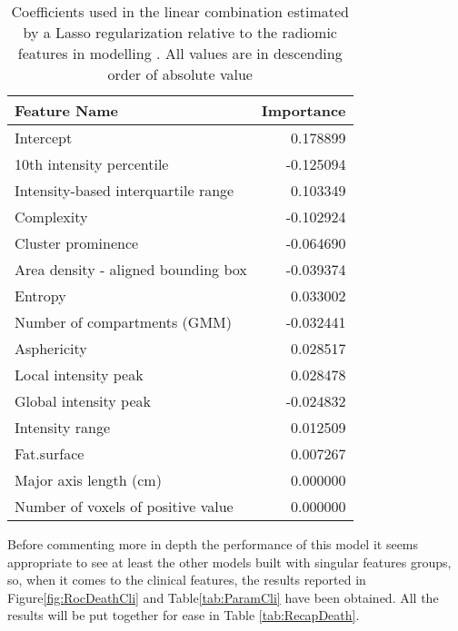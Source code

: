 \begin{table}
\caption{Coefficients used in the linear combination estimated by a Lasso regularization relative to the radiomic features in modelling \death. All values are in descending order of absolute value\label{tab:ParamRad}}
\centering 
	\begin{tabular}{lr}
		\toprule
		Feature Name &   Importance \\
		\midrule
		Intercept                           &                      0.178899 \\
		10th intensity percentile           &                     -0.125094 \\
		Intensity-based interquartile range &                      0.103349 \\
		Complexity                          &                     -0.102924 \\
		Cluster prominence                  &                     -0.064690 \\
		Area density - aligned bounding box &                     -0.039374 \\
		Entropy                             &                      0.033002 \\
		Number of compartments (GMM)        &                     -0.032441 \\
		Asphericity                         &                      0.028517 \\
		Local intensity peak                &                      0.028478 \\
		Global intensity peak               &                     -0.024832 \\
		Intensity range                     &                      0.012509 \\
		Fat.surface                         &                      0.007267 \\
		Major axis length (cm)              &                      0.000000 \\
		Number of voxels of positive value  &                      0.000000 \\
		\bottomrule
	\end{tabular}
\end{table}

Before commenting more in depth the performance of this model it seems appropriate to see at least the other models built with singular features groups, so, when it comes to the clinical features, the results reported in Figure\ref{fig:RocDeathCli} and Table\ref{tab:ParamCli} have been obtained. All the results will be put together for ease in Table \ref{tab:RecapDeath}.

